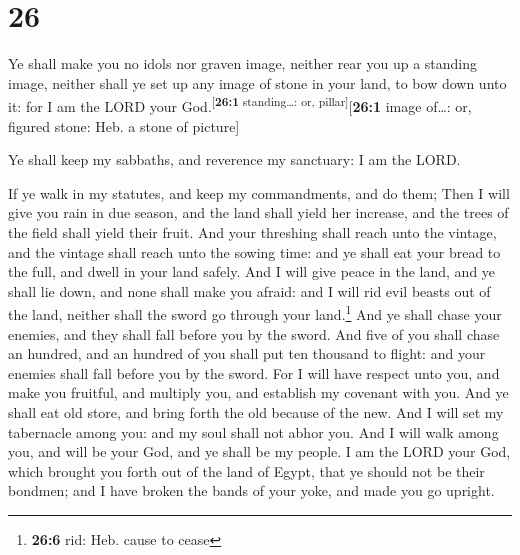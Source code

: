 \hypertarget{section-25}{%
\section{26}\label{section-25}}

 Ye shall make you no idols nor graven image, neither rear
you up a standing image, neither shall ye set up any image of stone in
your land, to bow down unto it: for I am the LORD your
God.\textsuperscript{{[}\textbf{26:1} standing\ldots: or,
pillar{]}}{[}\textbf{26:1} image of\ldots: or, figured stone: Heb. a
stone of picture{]}

 Ye shall keep my sabbaths, and reverence my sanctuary: I
am the LORD.

 If ye walk in my statutes, and keep my commandments, and
do them;  Then I will give you rain in due season, and the
land shall yield her increase, and the trees of the field shall yield
their fruit.  And your threshing shall reach unto the
vintage, and the vintage shall reach unto the sowing time: and ye shall
eat your bread to the full, and dwell in your land safely.
 And I will give peace in the land, and ye shall lie down,
and none shall make you afraid: and I will rid evil beasts out of the
land, neither shall the sword go through your land.\footnote{\textbf{26:6}
  rid: Heb. cause to cease}  And ye shall chase your
enemies, and they shall fall before you by the sword.  And
five of you shall chase an hundred, and an hundred of you shall put ten
thousand to flight: and your enemies shall fall before you by the sword.
 For I will have respect unto you, and make you fruitful,
and multiply you, and establish my covenant with you. 
And ye shall eat old store, and bring forth the old because of the new.
 And I will set my tabernacle among you: and my soul
shall not abhor you.  And I will walk among you, and will
be your God, and ye shall be my people.  I am the LORD
your God, which brought you forth out of the land of Egypt, that ye
should not be their bondmen; and I have broken the bands of your yoke,
and made you go upright.

